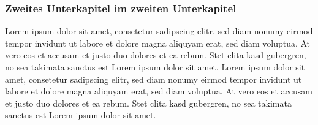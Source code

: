 \subsubsection{Zweites Unterkapitel im zweiten Unterkapitel}
Lorem ipsum dolor sit amet, consetetur sadipscing elitr, sed diam nonumy eirmod tempor invidunt ut labore et dolore magna aliquyam erat, sed diam voluptua. At vero eos et accusam et justo duo dolores et ea rebum. Stet clita kasd gubergren, no sea takimata sanctus est Lorem ipsum dolor sit amet. Lorem ipsum dolor sit amet, consetetur sadipscing elitr, sed diam nonumy eirmod tempor invidunt ut labore et dolore magna aliquyam erat, sed diam voluptua. At vero eos et accusam et justo duo dolores et ea rebum. Stet clita kasd gubergren, no sea takimata sanctus est Lorem ipsum dolor sit amet.